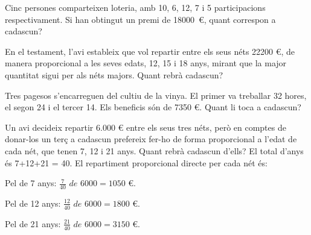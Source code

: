 \begin{mylist}
	\exer
	Cinc persones comparteixen loteria, amb 10, 6, 12, 7 i 5
	participacions respectivament. Si han obtingut un premi de
	18000~\euro{}, quant correspon a cadascun?
	
	
	\exer
	En el testament, l'avi estableix que vol repartir entre els seus néts
	22200 \euro{}, de manera proporcional a les seves edats, 12, 15 i 18
	anys, mirant que la major quantitat sigui per als néts majors. Quant
	rebrà cadascun?
	
	
	\exer
	Tres pagesos s'encarreguen del cultiu de la vinya. El primer va treballar 32 hores, el segon 24 i el tercer 14. Els beneficis són de 7350 \euro{}. Quant li toca a cadascun?
	
\end{mylist}

\pagebreak

\begin{resolt}{
Un avi decideix repartir 6.000 € entre els seus tres néts, però en comptes de donar-los un terç a cadascun prefereix fer-ho de forma proporcional a l'edat de cada nét, que tenen 7, 12 i 21 anys. Quant rebrà cadascun d'ells?
	}
	El total d'anys és 7+12+21 = 40. El repartiment proporcional directe per cada nét és:
	
	Pel de 7 anys: $\frac{7}{40} \,\, de\,\,  6000 =1050$ \euro. 
	
	Pel de 12 anys: $\frac{12}{40} \,\, de \,\, 6000 =1800$ \euro. 
	
	Pel de 21 anys: $\frac{21}{40} \,\, de\,\,  6000 =3150$ \euro. 
\end{resolt}

